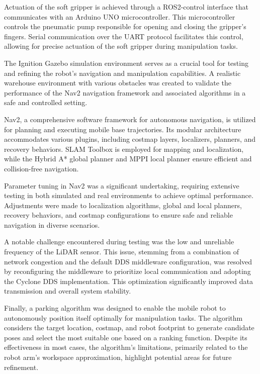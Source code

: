 Actuation of the soft gripper is achieved through a ROS2-control interface that communicates with an Arduino UNO
microcontroller. This microcontroller controls the pneumatic pump responsible for opening and closing the gripper's fingers.
Serial communication over the UART protocol facilitates this control, allowing for precise actuation of the soft
gripper during manipulation tasks.

The Ignition Gazebo simulation environment serves as a crucial tool for testing and refining the robot's navigation
and manipulation capabilities. A realistic warehouse environment with various obstacles was created to validate 
the performance of the Nav2 navigation framework and associated algorithms in a safe and controlled setting.

Nav2, a comprehensive software framework for autonomous navigation, is utilized for planning and executing mobile
base trajectories. Its modular architecture accommodates various plugins, including costmap layers, localizers,
planners, and recovery behaviors. SLAM Toolbox is employed for mapping and localization, while the Hybrid A* 
global planner and MPPI local planner ensure efficient and collision-free navigation.

Parameter tuning in Nav2 was a significant undertaking, requiring extensive testing in both simulated and real 
environments to achieve optimal performance. Adjustments were made to localization algorithms, global and local
planners, recovery behaviors, and costmap configurations to ensure safe and reliable navigation in diverse 
scenarios.

A notable challenge encountered during testing was the low and unreliable frequency of the LiDAR sensor. 
This issue, stemming from a combination of network congestion and the default DDS middleware configuration, 
was resolved by reconfiguring the middleware to prioritize local communication and adopting the Cyclone DDS 
implementation. This optimization significantly improved data transmission and overall system stability.

Finally, a parking algorithm was designed to enable the mobile robot to autonomously position itself optimally
for manipulation tasks. The algorithm considers the target location, costmap, and robot footprint to generate 
candidate poses and select the most suitable one based on a ranking function. Despite its effectiveness in most 
cases, the algorithm's limitations, primarily related to the robot arm's workspace approximation, highlight
potential areas for future refinement.


